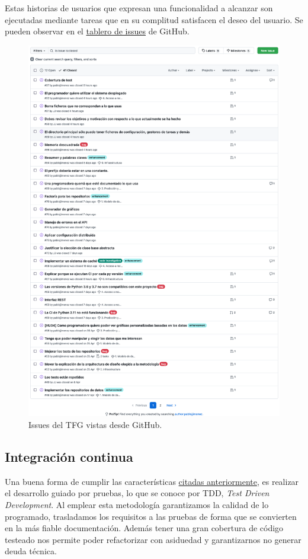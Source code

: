 Estas historias de usuarios que expresan una funcionalidad a alcanzar son ejecutadas
mediante tareas que en su complitud satisfacen el deseo del usuario. Se pueden observar en
el \href{https://github.com/pablojjimenez/TFG/issues}{tablero de issues} de GitHub.

\FloatBarrier
\begin{figure}[h]
	\centering
	\includegraphics[width=\textwidth]{doc/logos/imgs/issues.png}
	\caption{ Issues del TFG vistas desde GitHub. }
    \label{fig:issues-HU}
\end{figure}
\FloatBarrier


\subsection{Integración continua}
Una buena forma de cumplir las características \hyperref[sec:meto]{citadas anteriormente}, es realizar el
desarrollo guiado por pruebas, lo que se conoce por TDD, \textit{Test Driven Development}.
Al emplear esta metodología garantizamos la calidad de lo programado, trasladamos los
requisitos a las pruebas de forma que se convierten en la más fiable documentación. Además
tener una gran cobertura de código testeado nos permite poder refactorizar con asiduedad y
garantizarnos no generar deuda técnica. 

